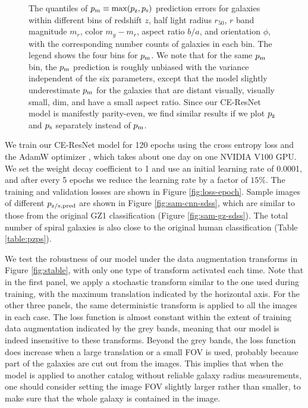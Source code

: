 \documentclass[twocolumn]{aastex631}
\begin{document}
\begin{figure}
    \caption{The quantiles of $p_{\rm m} \equiv \max(p_{\rm z},p_{\rm s})$ prediction errors for galaxies within different bins of redshift $z$, half light radius $r_{50}$, $r$ band magnitude $m_r$, color $m_g-m_r$, aspect ratio $b/a$, and orientation $\phi$, with the corresponding number counts of galaxies in each bin.
    The legend shows the four bins for $p_{\rm m}$.
    We note that for the same $p_{\rm m}$ bin, the $p_{\rm m}$ prediction is roughly unbiased with the variance independent of the six parameters, except that the model slightly underestimate $p_{\rm m}$ for the galaxies that are distant visually, visually small, dim, and have a small aspect ratio.
    Since our CE-ResNet model is manifestly parity-even, we find similar results if we plot $p_{\rm z}$ and $p_{\rm s}$ separately instead of $p_{\rm m}$.}
    \label{fig:sys}
\end{figure}

We train our CE-ResNet model for 120 epochs using the cross entropy loss and the AdamW optimizer \citep{loshchilov2017decoupled}, which takes about one day on one NVIDIA V100 GPU.
We set the weight decay coefficient to 1 and use an initial learning rate of 0.0001, and after every 5 epochs we reduce the learning rate by a factor of $15\%$.
The training and validation losses are shown in Figure \ref{fig:loss-epoch}.
Sample images of different $p_{\rm z/s,pred}$ are shown in Figure \ref{fig:sam-cnn-sdss}, which are similar to those from the original GZ1 classification (Figure \ref{fig:sam-gz-sdss}).
The total number of spiral galaxies is also close to the original human classification (Table \ref{table:pzps}).


We test the robustness of our model under the data augmentation transforms in Figure \ref{fig:stable}, with only one type of transform activated each time.
Note that in the first panel, we apply a stochastic transform similar to the one used during training, with the maximum translation indicated by the horizontal axis.
For the other three panels, the same deterministic transform is applied to all the images in each case.
The loss function is almost constant within the extent of training data augmentation indicated by the grey bands, meaning that our model is indeed insensitive to these transforms.
Beyond the grey bands, the loss function does increase when a large translation or a small FOV is used, probably because part of the galaxies are cut out from the images.
This implies that when the model is applied to another catalog without reliable galaxy radius measurements, one should consider setting the image FOV slightly larger rather than smaller, to make sure that the whole galaxy is contained in the image.
\end{document}
